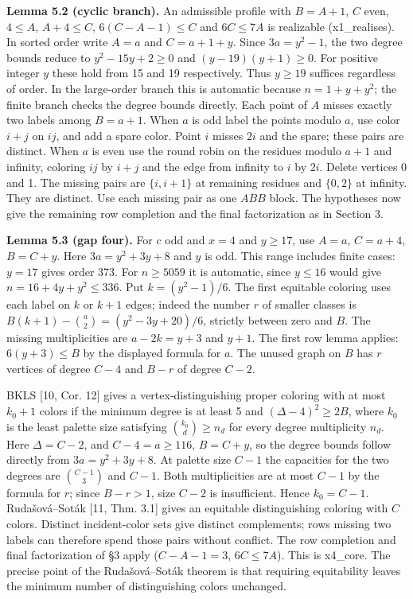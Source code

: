 \documentclass[english,11pt,a4paper]{article}
\begin{document}
\textbf{Lemma 5.2 (cyclic branch).} An admissible profile with \(B=A+1\), \(C\) even, \(4\le A\), \(A+4\le C\), \(6(C-A-1)\le C\) and \(6C\le7A\) is realizable (x1\_realises). In sorted order write \(A=a\) and \(C=a+1+y\). Since \(3a=y^2-1\), the two degree bounds reduce to \(y^2-15y+2\ge0\) and \((y-19)(y+1)\ge0\). For positive integer \(y\) these hold from 15 and 19 respectively. Thus \(y\ge19\) suffices regardless of order. In the large-order branch this is automatic because \(n=1+y+y^2\); the finite branch checks the degree bounds directly. Each point of \(A\) misses exactly two labels among \(B=a+1\). When \(a\) is odd label the points modulo \(a\), use color \(i+j\) on \(ij\), and add a spare color. Point \(i\) misses \(2i\) and the spare; these pairs are distinct. When \(a\) is even use the round robin on the residues modulo \(a+1\) and infinity, coloring \(ij\) by \(i+j\) and the edge from infinity to \(i\) by \(2i\). Delete vertices 0 and 1. The missing pairs are \(\{i,i+1\}\) at remaining residues and \(\{0,2\}\) at infinity. They are distinct. Use each missing pair as one \(ABB\) block. The hypotheses now give the remaining row completion and the final factorization as in Section 3.

\textbf{Lemma 5.3 (gap four).} For \(c\) odd and \(x=4\) and \(y\ge17\), use \(A=a\), \(C=a+4\), \(B=C+y\). Here \(3a=y^2+3y+8\) and \(y\) is odd. This range includes finite cases: \(y=17\) gives order 373. For \(n\ge5059\) it is automatic, since \(y\le16\) would give \(n=16+4y+y^2\le336\). Put \(k=(y^2-1)/6\). The first equitable coloring uses each label on \(k\) or \(k+1\) edges; indeed the number \(r\) of smaller classes is \(B(k+1)-\binom a2=(y^2-3y+20)/6\), strictly between zero and \(B\). The missing multiplicities are \(a-2k=y+3\) and \(y+1\). The first row lemma applies: \(6(y+3)\le B\) by the displayed formula for \(a\). The unused graph on \(B\) has \(r\) vertices of degree \(C-4\) and \(B-r\) of degree \(C-2\).

BKLS {[}10, Cor. 12{]} gives a vertex-distinguishing proper coloring with at most \(k_0+1\) colors if the minimum degree is at least 5 and \((\Delta-4)^2\ge2B\), where \(k_0\) is the least palette size satisfying \(\binom{k_0}{d}\ge n_d\) for every degree multiplicity \(n_d\). Here \(\Delta=C-2\), and \(C-4=a\ge116\), \(B=C+y\), so the degree bounds follow directly from \(3a=y^2+3y+8\). At palette size \(C-1\) the capacities for the two degrees are \(\binom{C-1}3\) and \(C-1\). Both multiplicities are at most \(C-1\) by the formula for \(r\); since \(B-r>1\), size \(C-2\) is insufficient. Hence \(k_0=C-1\). Rudašová--Soták {[}11, Thm. 3.1{]} gives an equitable distinguishing coloring with \(C\) colors. Distinct incident-color sets give distinct complements; rows missing two labels can therefore spend those pairs without conflict. The row completion and final factorization of §3 apply (\(C-A-1=3\), \(6C\le7A\)). This is x4\_core. The precise point of the Rudašová--Soták theorem is that requiring equitability leaves the minimum number of distinguishing colors unchanged.
\end{document}
